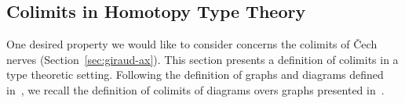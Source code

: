 \documentclass[preprint,9pt,numbers]{sigplanconf}
\newtheorem{prop}[thm]{Proposition}
\newtheorem{defi}[thm]{Definition}
\newcommand \defeq {\overset{de\hspace{-0.2ex}f}{=}}
\newcommand{\mynote}[2]{
    \fbox{\bfseries\sffamily\scriptsize#1}
    {\small$\blacktriangleright$\textsf{\emph{#2}}$\blacktriangleleft$}~}
\newcommand\kq[1]{\mynote{KQ}{#1}}
\newcommand{\ie}{i.e,\xspace}
\DeclareMathOperator{\im}{Im}
\newcommand \fib[2] {\mathrm{fib}_{#1}(#2)}
\newenvironment{mymath}[1][-0em]{%
  \newcommand\mymathaux{\vspace{#1}}%
  \vspace{#1}%
  \begin{equation*}%
  }{ %
    \mymathaux%
  \end{equation*}}
\begin{document}




\subsection{Colimits in Homotopy Type Theory }
\label{sec:colim-homot-type}

One desired property we would like to consider concerns the colimits
of \v{C}ech nerves (Section~\ref{sec:giraud-ax}). This section presents
a definition of colimits in a type theoretic setting.
% 
Following the definition of graphs and diagrams defined
in~\cite{lumsdaine}, we recall the definition of colimits of
diagrams overs graphs presented in~\cite{sets_in_hott}. 
%
\end{document}
